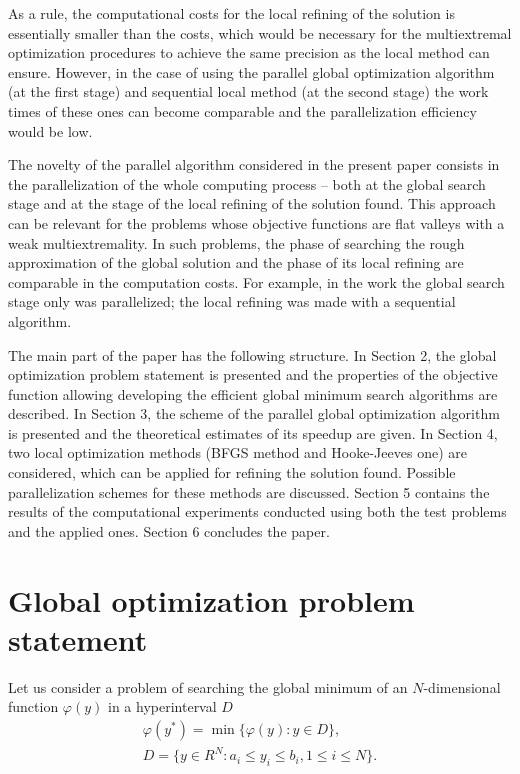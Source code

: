 \documentclass[runningheads]{llncs}
\begin{document}
As a rule, the computational costs for the local refining of the solution is essentially smaller than the costs, which would be necessary for the multiextremal optimization procedures to achieve the same precision as the local method can ensure. However, in the case of using the parallel global optimization algorithm (at the first stage) and sequential local method (at the second stage) the work times of these ones can become comparable and the parallelization efficiency would be low.

The novelty of the parallel algorithm considered in the present paper consists in the parallelization of the whole computing process -- both at the global search stage and at the stage of the local refining of the solution found. This approach can be relevant for the problems whose objective functions are flat valleys with a weak multiextremality. In such problems, the phase of searching the rough approximation of the global solution and the phase of its local refining are comparable in the computation costs.
For example, in the work \cite{Gubaydullin2021} the global search stage only was parallelized; the local refining was made with a sequential algorithm.

The main part of the paper has the following structure. In Section 2, the global optimization problem statement is presented and the properties of the objective function allowing developing the efficient global minimum search algorithms are described. In Section 3, the scheme of the parallel global optimization algorithm is presented and the theoretical estimates of its speedup are given. In Section 4, two local optimization methods (BFGS method and Hooke-Jeeves one) are considered, which can be applied for refining the solution found. Possible parallelization schemes for these methods are discussed. Section 5 contains the results of the computational experiments conducted using both the test problems and the applied ones. Section 6 concludes the paper.

\section{Global optimization problem statement}

Let us consider a problem of searching the global minimum of an $N$-dimensional function $\varphi(y)$ in a hyperinterval $D$
\begin{gather}
\varphi(y^*) = \min{\{ \varphi(y):y \in D \}}, \label{problemN} \\ 
D = \{ y \in R^{N}: a_i \leq y_i \leq b_i, 1 \leq i \leq N \}. \label{D}
\end{gather}
\end{document}
